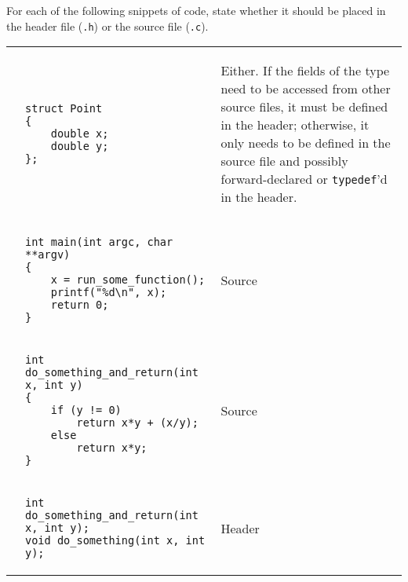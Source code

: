 For each of the following snippets of code, state whether it should be placed in the header file (\texttt{.h}) or the source file (\texttt{.c}).

\begin{enumerate}

\begin{tabular}{p{.25in}p{1.5in} p{4.5in}}
\item
&
{
\begin{lstlisting}[numbers=none]
struct Point
{
	double x;
	double y;
};
\end{lstlisting}
}
&
\begin{answer}
Either. If the fields of the type need to be accessed from other source files, it must be defined in the header; otherwise, it only needs to be defined in the source file and possibly forward-declared or \texttt{typedef}'d in the header.
\end{answer}
\\
\item
&
{
\begin{lstlisting}[numbers=none]
int main(int argc, char **argv)
{
	x = run_some_function();
	printf("%d\n", x);
	return 0;
}
\end{lstlisting}
}
&
\begin{answer}
\hspace{2.5in}
Source
\end{answer}
\\
\item
&
{
\begin{lstlisting}[numbers=none]
int do_something_and_return(int x, int y)
{
	if (y != 0)
		return x*y + (x/y);
	else
		return x*y;
}
\end{lstlisting}
}
&
\begin{answer}
\hspace{2.5in}
Source
\end{answer}
\\
\item
&
{
\begin{lstlisting}[numbers=none]
int do_something_and_return(int x, int y);
void do_something(int x, int y);
\end{lstlisting}
}
&
\begin{answer}
\hspace{2.5in}
Header
\end{answer}
\\
\end{tabular}
\end{enumerate}
